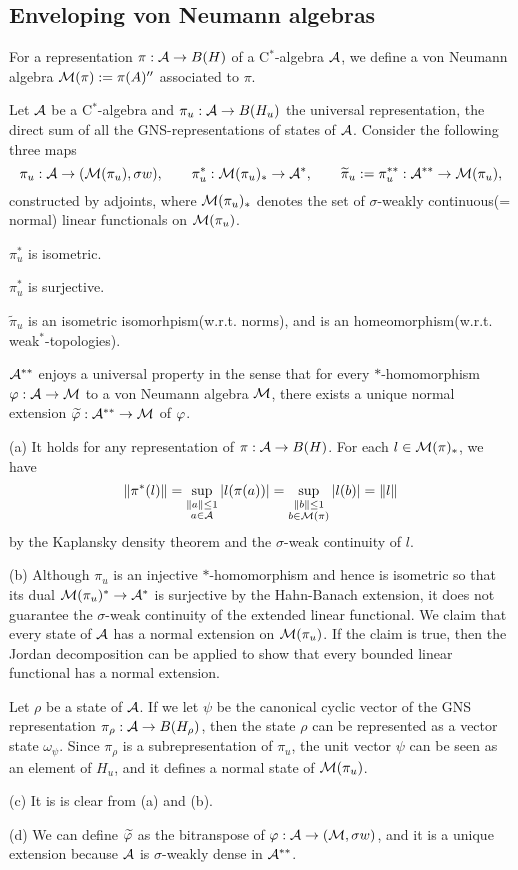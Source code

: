 \documentclass{../../small}
\begin{document}
\subsection{Enveloping von Neumann algebras}
\begin{defn}
For a representation $\pi:\mathcal{A}\to B(H)$ of a C$^*$-algebra $\mathcal{A}$, we define a von Neumann algebra $\mathcal{M}(\pi):=\pi(A)''$ associated to $\pi$.
\end{defn}

\begin{thm}
Let $\mathcal{A}$ be a C$^*$-algebra and $\pi_u:\mathcal{A}\to B(H_u)$ the universal representation, the direct sum of all the GNS-representations of states of $\mathcal{A}$.
Consider the following three maps
\[\pi_u:\mathcal{A}\to(\mathcal{M}(\pi_u),\sigma w),\qquad\pi_u^*:\mathcal{M}(\pi_u)_*\to\mathcal{A}^*,\qquad\widetilde\pi_u:=\pi_u^{**}:\mathcal{A}^{**}\to\mathcal{M}(\pi_u),\]
constructed by adjoints, where $\mathcal{M}(\pi_u)_*$ denotes the set of $\sigma$-weakly continuous(= normal) linear functionals on $\mathcal{M}(\pi_u)$.
\begin{parts}
\item $\pi_u^*$ is isometric.
\item $\pi_u^*$ is surjective.
\item $\tilde\pi_u$ is an isometric isomorhpism(w.r.t. norms), and is an homeomorphism(w.r.t. weak$^*$-topologies).
\item $\mathcal{A}^{**}$ enjoys a universal property in the sense that for every $*$-homomorphism $\varphi:\mathcal{A}\to\mathcal{M}$ to a von Neumann algebra $\mathcal{M}$, there exists a unique normal extension $\widetilde{\varphi}:\mathcal{A}^{**}\to\mathcal{M}$ of $\varphi$.
\end{parts}
\end{thm}
\begin{pf}
(a)
It holds for any representation of $\pi:\mathcal{A}\to B(H)$.
For each $l\in\mathcal{M}(\pi)_*$, we have
\[\|\pi^*(l)\|=\sup_{\substack{\|a\|\le1\\a\in\mathcal{A}}}|l(\pi(a))|=\sup_{\substack{\|b\|\le1\\b\in\mathcal{M}(\pi)}}|l(b)|=\|l\|\] by the Kaplansky density theorem and the $\sigma$-weak continuity of $l$.

(b)
Although $\pi_u$ is an injective $*$-homomorphism and hence is isometric so that its dual $\mathcal{M}(\pi_u)^*\to\mathcal{A}^*$ is surjective by the Hahn-Banach extension, it does not guarantee the $\sigma$-weak continuity of the extended linear functional.
We claim that every state of $\mathcal{A}$ has a normal extension on $\mathcal{M}(\pi_u)$.
If the claim is true, then the Jordan decomposition can be applied to show that every bounded linear functional has a normal extension.

Let $\rho$ be a state of $\mathcal{A}$.
If we let $\psi$ be the canonical cyclic vector of the GNS representation $\pi_\rho:\mathcal{A}\to B(H_\rho)$, then the state $\rho$ can be represented as a vector state $\omega_\psi$.
Since $\pi_\rho$ is a subrepresentation of $\pi_u$, the unit vector $\psi$ can be seen as an element of $H_u$, and it defines a normal state of $\mathcal{M}(\pi_u)$.

(c)
It is is clear from (a) and (b).

(d)
We can define $\widetilde{\varphi}$ as the bitranspose of $\varphi:\mathcal{A}\to(\mathcal{M},\sigma w)$, and it is a unique extension because $\mathcal{A}$ is $\sigma$-weakly dense in $\mathcal{A}^{**}$.
\end{pf}
\end{document}
